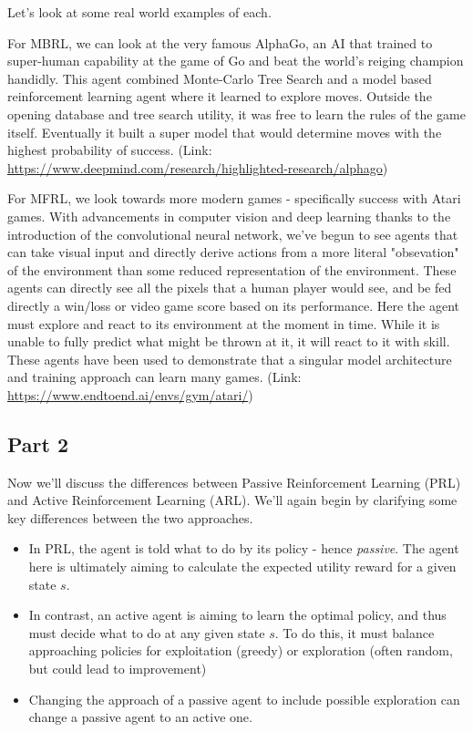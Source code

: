 \documentclass{article}
\begin{document}
\noindent Let's look at some real world examples of each.

For MBRL, we can look at the very famous AlphaGo, an AI that trained to super-human capability at the game of Go and beat the world's reiging champion handidly. This agent combined Monte-Carlo Tree Search and a model based reinforcement learning agent where it learned to explore moves. Outside the opening database and tree search utility, it was free to learn the rules of the game itself. Eventually it built a super model that would determine moves with the highest probability of success. (Link: \url{https://www.deepmind.com/research/highlighted-research/alphago})

For MFRL, we look towards more modern games - specifically success with Atari games. With advancements in computer vision and deep learning thanks to the introduction of the convolutional neural network, we've begun to see agents that can take visual input and directly derive actions from a more literal "obsevation" of the environment than some reduced representation of the environment. These agents can directly see all the pixels that a human player would see, and be fed directly a win/loss or video game score based on its performance. Here the agent must explore and react to its environment at the moment in time. While it is unable to fully predict what might be thrown at it, it will react to it with skill. These agents have been used to demonstrate that a singular model architecture and training approach can learn many games. (Link: \url{https://www.endtoend.ai/envs/gym/atari/})

\subsection*{Part 2}

Now we'll discuss the differences between Passive Reinforcement Learning (PRL) and Active Reinforcement Learning (ARL). We'll again begin by clarifying some key differences between the two approaches.

\begin{itemize}
    \item In PRL, the agent is told what to do by its policy - hence \textit{passive}. The agent here is ultimately aiming to calculate the expected utility reward for a given state $s$.
    \item In contrast, an active agent is aiming to learn the optimal policy, and thus must decide what to do at any given state $s$. To do this, it must balance approaching policies for exploitation (greedy) or exploration (often random, but could lead to improvement)
    \item Changing the approach of a passive agent to include possible exploration can change a passive agent to an active one.
\end{itemize}
\end{document}
